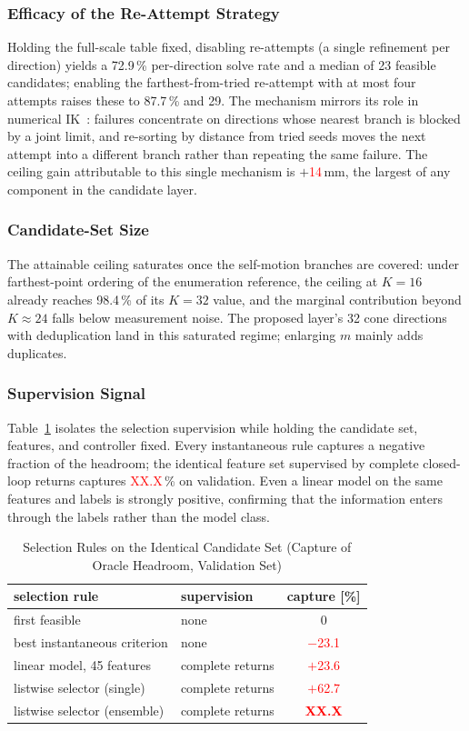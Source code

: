 \documentclass[journal]{IEEEtran}
\newcommand{\ph}[1]{\textcolor{red}{#1}}
\newcommand{\phCapVal}{\ph{XX.X}}
\begin{document}
\subsubsection{Efficacy of the Re-Attempt Strategy}
\label{sec:abl-retry}
Holding the full-scale table fixed, disabling re-attempts (a single
refinement per direction) yields a 72.9\,\% per-direction solve rate and
a median of 23 feasible candidates; enabling the farthest-from-tried
re-attempt with at most four attempts raises these to 87.7\,\% and 29.
The mechanism mirrors its role in numerical IK~\cite{yuan2026iksel}:
failures concentrate on directions whose nearest branch is blocked by a
joint limit, and re-sorting by distance from tried seeds moves the next
attempt into a different branch rather than repeating the same failure.
The ceiling gain attributable to this single mechanism is
$+$\ph{14}\,mm, the largest of any component in the candidate layer.

\subsubsection{Candidate-Set Size}
The attainable ceiling saturates once the self-motion branches are
covered: under farthest-point ordering of the enumeration reference, the
ceiling at $K{=}16$ already reaches 98.4\,\% of its $K{=}32$ value, and
the marginal contribution beyond $K{\approx}24$ falls below measurement
noise. The proposed layer's 32 cone directions with deduplication land
in this saturated regime; enlarging $m$ mainly adds duplicates.

\subsubsection{Supervision Signal}
\label{sec:abl-sup}
Table~\ref{tab:sup} isolates the selection supervision while holding the
candidate set, features, and controller fixed. Every instantaneous rule
captures a negative fraction of the headroom; the identical feature set
supervised by complete closed-loop returns captures
\phCapVal\,\% on validation. Even a linear model on the same features
and labels is strongly positive, confirming that the information enters
through the labels rather than the model class.

\begin{table}[!t]
\caption{Selection Rules on the Identical Candidate Set (Capture of
Oracle Headroom, Validation Set)}
\label{tab:sup}
\centering
\footnotesize
\begin{tabular}{llc}
\toprule
selection rule & supervision & capture [\%] \\
\midrule
first feasible & none & $0$ \\
best instantaneous criterion & none & \ph{$-$23.1} \\
linear model, 45 features & complete returns & \ph{$+$23.6} \\
listwise selector (single) & complete returns & \ph{$+$62.7} \\
listwise selector (ensemble) & complete returns & \textbf{\phCapVal} \\
\bottomrule
\end{tabular}
\end{table}
\end{document}
